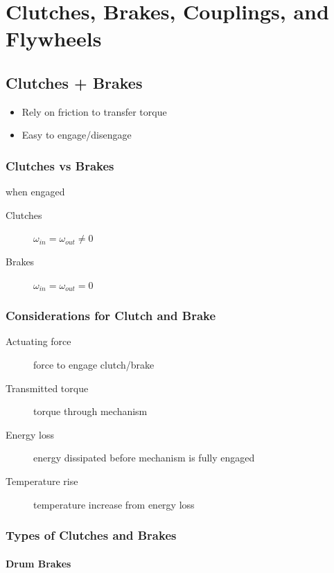 \documentclass[
10pt,
a4paper,
openany,
svgnames,
]{book}
\begin{document}
\chapter{Clutches, Brakes, Couplings, and Flywheels}

\section*{Clutches + Brakes}
\label{sec:orgdb7c59e}

\begin{itemize}
\item Rely on friction to transfer torque
\item Easy to engage/disengage
\end{itemize}

\subsection*{Clutches vs Brakes}
\label{sec:org3df5a76}

when engaged

\begin{description}
\item[{Clutches}] \(\omega_{in} = \omega_{out} \neq 0\)
\item[{Brakes}] \(\omega_{in} = \omega_{out} = 0\)
\end{description}

\subsection*{Considerations for Clutch and Brake}
\label{sec:org27fd7e5}

\begin{description}
\item[{Actuating force}] force to engage clutch/brake
\item[{Transmitted torque}] torque through mechanism
\item[{Energy loss}] energy dissipated before mechanism is fully engaged
\item[{Temperature rise}] temperature increase from energy loss
\end{description}

\subsection*{Types of Clutches and Brakes}
\label{sec:org174ba06}

\subsubsection*{Drum Brakes}
\label{sec:org507824f}
\end{document}
